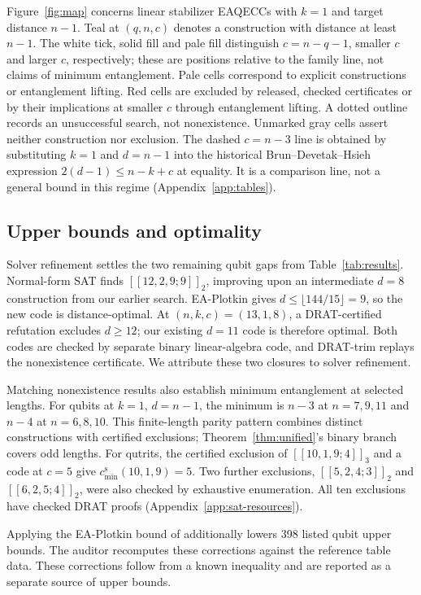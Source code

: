 \documentclass{article}
\newcommand{\cmins}{c^{\mathrm{s}}_{\min}}
\begin{document}


Figure~\ref{fig:map} concerns linear stabilizer EAQECCs with $k=1$
and target distance $n-1$. Teal at $(q,n,c)$ denotes a construction
with distance at least $n-1$. The white tick, solid fill and
pale fill distinguish $c=n-q-1$, smaller $c$ and larger $c$, respectively;
these are positions relative to the family line, not claims of minimum
entanglement. Pale cells correspond to explicit constructions or entanglement
lifting. Red cells are excluded by released, checked certificates or
by their implications at smaller $c$ through entanglement lifting. A dotted
outline records an unsuccessful search, not nonexistence. Unmarked gray
cells assert neither construction nor exclusion. The dashed $c=n-3$
line is obtained by substituting $k=1$ and $d=n-1$ into the historical
Brun--Devetak--Hsieh expression $2(d-1)\le n-k+c$ at equality.
It is a comparison line, not a general bound in this regime
(Appendix~\ref{app:tables}).

\subsection{Upper bounds and optimality}\label{sec:optimality-results}

Solver refinement settles the two remaining qubit gaps from
Table~\ref{tab:results}. Normal-form SAT finds $[[12,2,9;9]]_2$,
improving upon an intermediate $d=8$ construction from our earlier search. EA-Plotkin gives
$d\le\lfloor144/15\rfloor=9$, so the new code is distance-optimal.
At $(n,k,c)=(13,1,8)$, a DRAT-certified refutation excludes $d\ge12$;
our existing $d=11$ code is therefore optimal. Both codes are
checked by separate binary linear-algebra code, and DRAT-trim replays
the nonexistence certificate. We attribute these two closures to solver refinement.

Matching nonexistence results also establish minimum entanglement at
selected lengths. For qubits at $k=1$, $d=n-1$, the minimum is $n-3$
at $n=7,9,11$ and $n-4$ at $n=6,8,10$. This finite-length parity
pattern combines distinct constructions with certified exclusions;
Theorem~\ref{thm:unified}'s binary branch covers odd lengths.
For qutrits, the certified
exclusion of $[[10,1,9;4]]_3$ and a code at $c=5$ give
$\cmins(10,1,9)=5$. Two further exclusions, $[[5,2,4;3]]_2$ and $[[6,2,5;4]]_2$,
were also checked by exhaustive enumeration. All ten exclusions have
checked DRAT proofs (Appendix~\ref{app:sat-resources}).

Applying the EA-Plotkin bound of \citet{GuoLi2013} additionally lowers
398 listed qubit upper bounds. The auditor recomputes these corrections
against the reference table data. These corrections follow from a known
inequality and are reported as a separate source of upper bounds.
\end{document}
